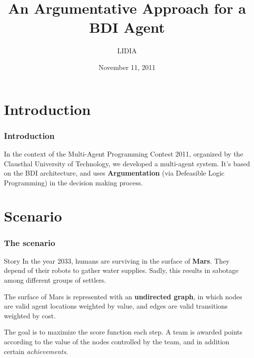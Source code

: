 \documentclass[pdf,xcolor=svgnames]{beamer}
\title{An Argumentative Approach for a BDI Agent}
\author{LIDIA}
\institute{Universidad Nacional del Sur} %
\date{November 11, 2011}
\begin{document}


\begin{frame}
\titlepage

\end{frame}



\section{Introduction}

\begin{frame}
\frametitle{Introduction}
\begin{block}{}
In the context of the Multi-Agent Programming Contest 2011, organized by the Clausthal University of
 Technology, we developed a multi-agent system. It's based on the BDI architecture, and uses \textbf{Argumentation} (via Defeasible Logic Programming) in the decision making process.
\end{block}
\end{frame}


\section{Scenario}

\begin{frame}

\frametitle{The scenario}

\begin{block}{Story}
In the year 2033, humans are surviving in the surface of \textbf{Mars}. They 
depend of their robots to gather water supplies. Sadly, this results in sabotage among different groups of settlers.
\end{block}
\pause

The surface of Mars is represented with an \textbf{undirected graph}, in which 
nodes are valid agent locations weighted by value, and edges are valid
transitions weighted by cost. 
\pause

The goal is to maximize the score function each step. A team is awarded
points according to the value of the nodes controlled by the team, and
in addition certain \textit{achievements}.
\end{frame}
\end{document}
